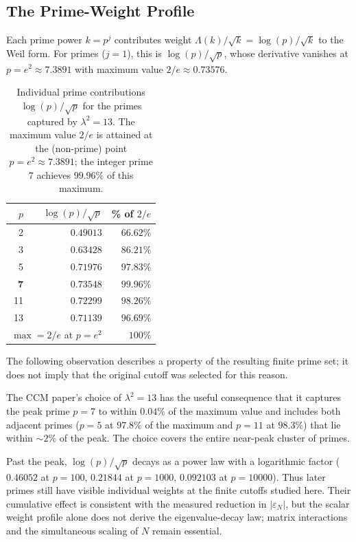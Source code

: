 \documentclass[11pt,a4paper]{article}
\begin{document}
\subsection{The Prime-Weight Profile}

Each prime power $k = p^j$ contributes weight
$\Lambda(k)/\sqrt{k} = \log(p)/\sqrt{k}$ to the Weil form. For
primes ($j=1$), this is $\log(p)/\sqrt{p}$, whose derivative
vanishes at $p = e^2 \approx 7.3891$ with maximum value
$2/e \approx 0.73576$.

\begin{table}[!htbp]
\centering
\caption{Individual prime contributions $\log(p)/\sqrt{p}$ for the
primes captured by $\lambda^2 = 13$. The maximum value $2/e$ is
attained at the (non-prime) point $p = e^2 \approx 7.3891$;
the integer prime $7$ achieves $99.96\%$ of this maximum.}
\label{tab:prime_contributions}
\begin{tabular}{@{}rrr@{}}
\toprule
$p$ & $\log(p)/\sqrt{p}$ & \% of $2/e$ \\
\midrule
2  & $0.49013$ & $66.62\%$ \\
3  & $0.63428$ & $86.21\%$ \\
5  & $0.71976$ & $97.83\%$ \\
\textbf{7}  & $\mathbf{0.73548}$ & $\mathbf{99.96\%}$ \\
11 & $0.72299$ & $98.26\%$ \\
13 & $0.71139$ & $96.69\%$ \\
\midrule
\multicolumn{2}{r}{$\max = 2/e$ at $p = e^2$} & $100\%$ \\
\bottomrule
\end{tabular}
\end{table}

The following observation describes a property of the resulting finite prime set; it does not imply that the original cutoff was selected for this reason.

The CCM paper's choice of $\lambda^2 = 13$ has the useful consequence
that it captures the peak prime $p = 7$ to within $0.04\%$ of the
maximum value and includes
both adjacent primes ($p = 5$ at $97.8\%$ of the maximum and
$p = 11$ at $98.3\%$) that lie within $\sim 2\%$ of the peak. The
choice covers the entire near-peak cluster of primes.

Past the peak, $\log(p)/\sqrt{p}$ decays as a power law with a
logarithmic factor ($0.46052$ at $p = 100$, $0.21844$ at $p = 1000$,
$0.092103$ at $p = 10000$). Thus later primes still have visible
individual weights at the finite cutoffs studied here. Their
cumulative effect is consistent with the measured reduction in
$|\varepsilon_N|$, but the scalar weight profile alone does not derive
the eigenvalue-decay law; matrix interactions and the simultaneous
scaling of $N$ remain essential.
\end{document}
